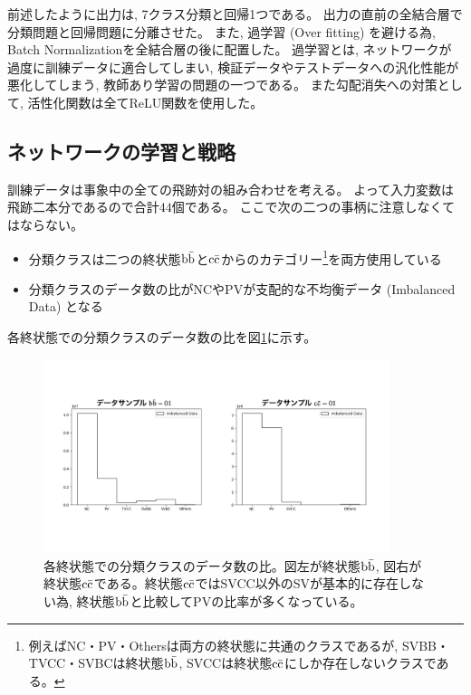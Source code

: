 前述したように出力は, 7クラス分類と回帰1つである。
出力の直前の全結合層で分類問題と回帰問題に分離させた。
また, 過学習 (Over fitting) を避ける為, Batch Normalization\cite{BatchNormalizationpaper}を全結合層の後に配置した。
過学習とは, ネットワークが過度に訓練データに適合してしまい, 検証データやテストデータへの汎化性能が悪化してしまう, 教師あり学習の問題の一つである。
また勾配消失への対策として, 活性化関数は全てReLU関数を使用した。


\subsection{ネットワークの学習と戦略} \label{Net:PM:TrainingandStrategyofPM}

訓練データは事象中の全ての飛跡対の組み合わせを考える。
よって入力変数は飛跡二本分であるので合計$44$個である。
ここで次の二つの事柄に注意しなくてはならない。

\begin{itemize}
 \item 分類クラスは二つの終状態$\rm b\bar{b}$と$\rm c\bar{c}$からのカテゴリー\footnote{例えばNC・PV・Othersは両方の終状態に共通のクラスであるが, SVBB・TVCC・SVBCは終状態$\rm b\bar{b}$, SVCCは終状態$\rm c\bar{c}$にしか存在しないクラスである。}を両方使用している
 \item 分類クラスのデータ数の比がNCやPVが支配的な不均衡データ (Imbalanced Data) となる
\end{itemize}

各終状態での分類クラスのデータ数の比を図\ref{3-3-2-1ImbalancedData}に示す。

\begin{figure}[htbp]
 \centering
 \includegraphics[trim = 100 200 100 150, width=0.9\textwidth, clip]{Figure/3Networks/3-3-2-1ImbalancedData.png}
 \caption[各終状態での分類クラスのデータ数の比]{各終状態での分類クラスのデータ数の比。図左が終状態$\rm b\bar{b}$, 図右が終状態$\rm c\bar{c}$である。終状態$\rm c\bar{c}$ではSVCC以外のSVが基本的に存在しない為, 終状態$\rm b\bar{b}$と比較してPVの比率が多くなっている。}
 \label{3-3-2-1ImbalancedData}
\end{figure}

